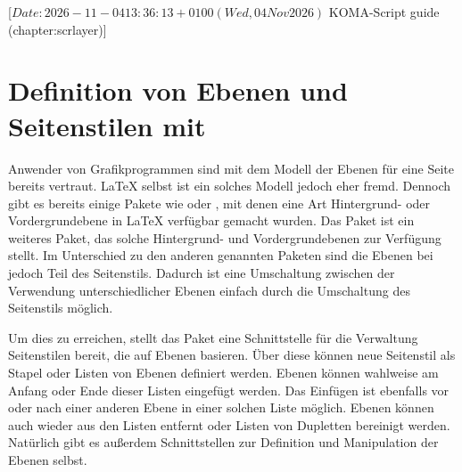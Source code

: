 %
%
%
%
%
%
%

%
                 [$Date: 2026-11-04 13:36:13 +0100 (Wed, 04 Nov 2026) $
                  KOMA-Script guide (chapter:scrlayer)]

\chapter[{Definition von Ebenen und Seitenstilen mit \Package{scrlayer}}]
  {Definition von Ebenen und Seitenstilen
    mit }

\BeginIndexGroup
{}%
%
Anwender von Grafikprogrammen sind mit dem Modell der Ebenen für eine Seite
bereits vertraut. \LaTeX{} selbst ist ein solches Modell jedoch eher
fremd. Dennoch gibt es bereits einige Pakete wie  oder
, mit denen eine Art Hintergrund- oder
Vor\-der\-grund\-ebe\-ne in \LaTeX{} verfügbar gemacht wurden. Das Paket
 ist ein weiteres Paket, das solche Hintergrund- und
Vordergrundebenen zur Verfügung stellt. Im Unterschied zu den anderen
genannten Paketen sind die Ebenen bei  jedoch Teil des
Seitenstils. Dadurch ist eine Umschaltung zwischen der Verwendung
unterschiedlicher Ebenen einfach durch die Umschaltung des Seitenstils möglich.

Um dies zu erreichen, stellt das Paket eine Schnittstelle für die Verwaltung
Seitenstilen bereit, die auf Ebenen basieren. Über diese können neue
Seitenstil als Stapel oder Listen von Ebenen definiert werden. Ebenen können
wahlweise am Anfang oder Ende dieser Listen eingefügt werden. Das Einfügen ist
ebenfalls vor oder nach einer anderen Ebene in einer solchen Liste
möglich. Ebenen können auch wieder aus den Listen entfernt oder Listen von
Dupletten bereinigt werden. Natürlich gibt es außerdem Schnittstellen zur
Definition und Manipulation der Ebenen selbst.

